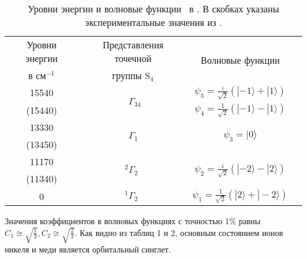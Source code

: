 \begin{table} [htbp]%
	\centering
	\begin{threeparttable}%
		\caption{Уровни энергии и волновые функции \cu\ в \cbo. В скобках указаны экспериментальные значения из \cite{Pisarev2011}.}%
		\label{tab:CuEnAndWf}%
		\begin{SingleSpace}
			\begin{tabular}{| c | c | c | c |}
				\hline 
				Уровни энергии & Представления точечной & \multirow{2}{*}{Волновые функции} \\ 
				в см$^{-1}$ & группы $\mathrm{S}_{4}$ &  \\ 
				\hline 
				15540 & \multirow{2}{*}{$\phantom{{ }^{2} }\Gamma_{34}$} & $\psi_{5}=\frac{i}{\sqrt{2}}(|-1\rangle+|1\rangle)$ \\
				(15440) & & $\psi_{4}=\frac{1}{\sqrt{2}}(|-1\rangle-|1\rangle)$ \\
				\hline
				13330 & \multirow{2}{*}{$\phantom{{ }^{2} }\Gamma_{1\phantom{4}}$} & \multirow{2}{*}{$\psi_{3}=|0\rangle$} \\
				(13450) & & \\
				\hline
				11170 & \multirow{2}{*}{${ }^{2} \Gamma_{2\phantom{4}}$} & \multirow{2}{*}{$\psi_{2}=\frac{i}{\sqrt{2}}(|-2\rangle-|2\rangle)$} \\
				(11340) & & \\
				\hline
				0 & ${ }^{1} \Gamma_{2\phantom{4}}$ & $\psi_{1}=\frac{1}{\sqrt{2}}(|2\rangle+|-2\rangle)$ \\
				\hline
			\end{tabular}%
		\end{SingleSpace}
	\end{threeparttable}
\end{table}

Значения коэффициентов в волновых функциях с точностью 1\% равны $C_{1}\cong\sqrt{\frac{1}{3}}, C_{2}\cong\sqrt{\frac{2}{3}}$. Как видно из таблиц 1 и 2, основным состоянием ионов никеля и меди является орбитальный синглет.

\FloatBarrier
